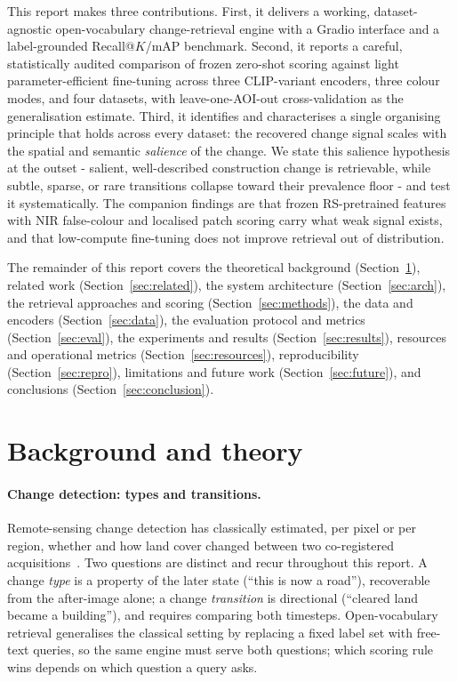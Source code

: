 \documentclass{article}
\begin{document}
This report makes three contributions. First, it delivers a working,
dataset-agnostic open-vocabulary change-retrieval engine with a Gradio interface
and a label-grounded Recall@$K$/mAP benchmark. Second, it reports a careful,
statistically audited comparison of frozen zero-shot scoring against light
parameter-efficient fine-tuning across three CLIP-variant encoders, three colour
modes, and four datasets, with leave-one-AOI-out cross-validation as the
generalisation estimate. Third, it identifies and characterises a single
organising principle that holds across every dataset: the recovered change
signal scales with the spatial and semantic \emph{salience} of the change. We
state this salience hypothesis at the outset - salient, well-described
construction change is retrievable, while subtle, sparse, or rare transitions
collapse toward their prevalence floor - and test it systematically. The
companion findings are that frozen RS-pretrained features with NIR false-colour
and localised patch scoring carry what weak signal exists, and that low-compute
fine-tuning does not improve retrieval out of distribution.

The remainder of this report covers the theoretical background
(Section~\ref{sec:background}), related work (Section~\ref{sec:related}), the
system architecture (Section~\ref{sec:arch}), the retrieval approaches and
scoring (Section~\ref{sec:methods}), the data and encoders
(Section~\ref{sec:data}), the evaluation protocol and metrics
(Section~\ref{sec:eval}), the experiments and results
(Section~\ref{sec:results}), resources and operational metrics
(Section~\ref{sec:resources}), reproducibility (Section~\ref{sec:repro}),
limitations and future work (Section~\ref{sec:future}), and conclusions
(Section~\ref{sec:conclusion}).


\section{Background and theory}
\label{sec:background}

\paragraph{Change detection: types and transitions.}
Remote-sensing change detection has classically estimated, per pixel or per
region, whether and how land cover changed between two co-registered
acquisitions~\cite{changedetection}. Two questions are distinct and recur
throughout this report. A change \emph{type} is a property of the later state
(``this is now a road''), recoverable from the after-image alone; a change
\emph{transition} is directional (``cleared land became a building''), and
requires comparing both timesteps. Open-vocabulary retrieval generalises the
classical setting by replacing a fixed label set with free-text queries, so the
same engine must serve both questions; which scoring rule wins depends on which
question a query asks.
\end{document}
